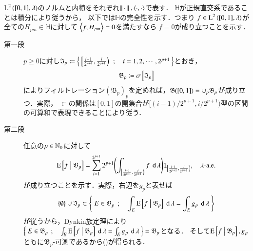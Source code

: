 	\begin{prf}
		$\operatorname{L}^{2} \left([0,1],\lambda\right)$のノルムと内積をそれぞれ$\Norm{\cdot}{},\inprod<\cdot,\cdot>$で表す．
		$\mathbb{H}$が正規直交系であることは積分により従うから，
		以下では$\mathbb{H}$の完全性を示す．つまり
		$f \in \operatorname{L}^{2} \left([0,1],\lambda\right)$が全ての$H_{pm} \in \mathbb{H}$に対して
		$\inprod<f,H_{pm}> = 0$を満たすなら
		$f = 0$が成り立つことを示す．
		\begin{description}
			\item[第一段]
				$p \geq 0$に対し$\mathfrak{I}_p \coloneqq \left\{\  \left[ \frac{i-1}{2^{p+1}}, \frac{i}{2^{p+1}} \right)\ \, ; \quad  i = 1,2,\cdots,2^{p+1} \ \right\}$とおき，
				\begin{align}
					\mathfrak{B}_p \coloneqq \sigma \left[\mathfrak{I}_p\right]
				\end{align}
				によりフィルトレーション$\left( \mathfrak{B}_p \right)_p$を定めれば，$\mathfrak{B}([0,1]) = \cup_p \mathfrak{B}_p$が成り立つ．実際，
				$\subset$の関係は$[0,1]$の開集合が$[(i-1)/2^{p+1},i/2^{p+1})$型の区間の可算和で表現できることにより従う．
				
			\item[第二段]
				任意の$p \in \mathbb{N}_0$に対して
				\begin{align}
					\operatorname{E} \left[ f \ \middle|\ \mathfrak{B}_p \right] = \sum_{i=1}^{2^{p+1}} 2^{p+1} \Biggl( \int_{\left[ \frac{i-1}{2^{p+1}}, \frac{i}{2^{p+1}} \right)} f \ \operatorname{d}\lambda
						\Biggr) \mbox{1}\hspace{-0.25em}\mbox{l}_{\left[ \frac{i-1}{2^{p+1}}, \frac{i}{2^{p+1}} \right)}
					,\quad \mbox{$\lambda$-a.e.}
					\label{eq:thm_Haar_functions_orthogonal_basis_1}
 				\end{align}
 				が成り立つことを示す．実際，右辺を$g_p$と表せば
 				\begin{align}
 					\{\emptyset\} \cup \mathfrak{I}_p \subset
 					\left\{\ E \in \mathfrak{B}_p\ \, ; \quad \int_E \operatorname{E} \left[ f \ \middle|\ \mathfrak{B}_p \right] \ \operatorname{d}\lambda = \int_E g_p \ \operatorname{d}\lambda\ \right\}
 					\label{eq:thm_Haar_functions_orthogonal_basis_2}
 				\end{align}
 				が従うから，Dynkin族定理により$\left\{\ E \in \mathfrak{B}_p\ \, ; \quad \int_E \operatorname{E} \left[ f \ \middle|\ \mathfrak{B}_p \right] \ \operatorname{d}\lambda = \int_E g_p \ \operatorname{d}\lambda\ \right\} = \mathfrak{B}_p$となる．
 				そして$\operatorname{E} \left[ f \ \middle|\ \mathfrak{B}_p \right],g_p$ともに$\mathfrak{B}_p$-可測であるから()が得られる．
 				

\end{description}
\end{prf}
